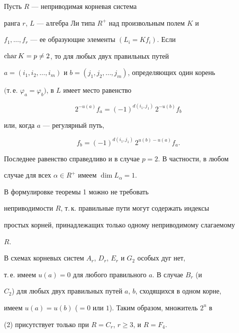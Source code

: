 \begin{thm}


Пусть $R$ --- неприводимая корневая система


ранга $r$, $L$ --- алгебра Ли типа $R^+$ над произвольным полем $K$ и


$f_1,\dotsc,f_r$ --- ее образующие элементы $(L_i=Kf_i)$. Если


$\operatorname{char} K=p\ne2$, то для любых двух правильных путей


$a=(i_1,i_2,\dotsc,i_m)$ и $b=(j_1,j_2,\dotsc,j_m)$, определяющих один корень


$($т.\,е. $\varphi_a=\varphi_b)$, в $L$ имеет место равенство


\begin{equation}


2^{-u(a)}f_a=(-1)^{d(i_1,j_1)}\,2^{-u(b)}f_b


\end{equation}


или, когда $a$ --- регулярный путь,


\begin{equation}


f_b=(-1)^{d(i_1,j_1)}\,2^{u(b)-u(a)}f_a.


\end{equation}


Последнее равенство справедливо и в случае $p=2$. В частности, в любом


случае для всех $\alpha\in R^+$ имеем $\dim L_\alpha=1$.


\end{thm}





\begin{note}


В формулировке теоремы 1 можно не требовать


неприводимости $R$, т.\,к. правильные пути могут содержать индексы


простых корней, принадлежащих только одному неприводимому слагаемому


$R$.


\end{note}





\begin{note}


В схемах корневых систем $A_r$, $D_r$, $E_r$ и $G_2$ особых дуг нет,


т.\,е. имеем $u(a)=0$ для любого правильного $a$. В случае $B_r$ (и


$C_2$) для любых двух правильных путей $a$, $b$, сходящихся в одном корне,


имеем $u(a)=u(b)$ ($=0$ или $1$). Таким образом, множитель $2^u$ в


(2) присутствует только при $R=C_r$, $r\ge 3$, и $R=F_4$.


\end{note}





